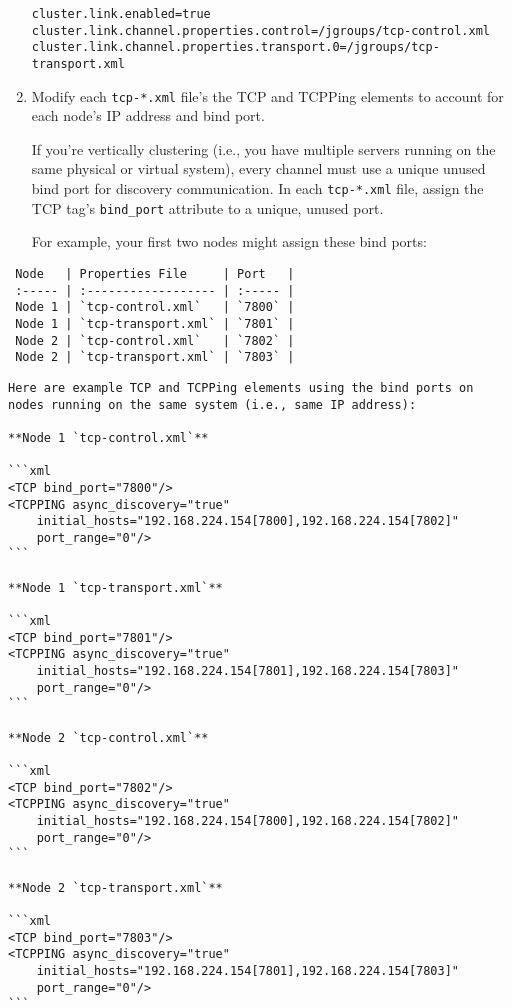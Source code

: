 \begin{enumerate}
\begin{verbatim}
cluster.link.enabled=true
cluster.link.channel.properties.control=/jgroups/tcp-control.xml
cluster.link.channel.properties.transport.0=/jgroups/tcp-transport.xml
\end{verbatim}
\item
  Modify each \texttt{tcp-*.xml} file's the TCP and TCPPing elements to
  account for each node's IP address and bind port.

  If you're vertically clustering (i.e., you have multiple servers
  running on the same physical or virtual system), every channel must
  use a unique unused bind port for discovery communication. In each
  \texttt{tcp-*.xml} file, assign the TCP tag's \texttt{bind\_port}
  attribute to a unique, unused port.

  For example, your first two nodes might assign these bind ports:
\end{enumerate}

\noindent\hrulefill

\begin{verbatim}
 Node   | Properties File     | Port   |
 :----- | :------------------ | :----- |
 Node 1 | `tcp-control.xml`   | `7800` |
 Node 1 | `tcp-transport.xml` | `7801` |
 Node 2 | `tcp-control.xml`   | `7802` |
 Node 2 | `tcp-transport.xml` | `7803` |
\end{verbatim}

\noindent\hrulefill

\begin{verbatim}
Here are example TCP and TCPPing elements using the bind ports on nodes running on the same system (i.e., same IP address):

**Node 1 `tcp-control.xml`**

```xml
<TCP bind_port="7800"/>
<TCPPING async_discovery="true"
    initial_hosts="192.168.224.154[7800],192.168.224.154[7802]"
    port_range="0"/>
```

**Node 1 `tcp-transport.xml`**

```xml
<TCP bind_port="7801"/>
<TCPPING async_discovery="true"
    initial_hosts="192.168.224.154[7801],192.168.224.154[7803]"
    port_range="0"/>
```

**Node 2 `tcp-control.xml`**

```xml
<TCP bind_port="7802"/>
<TCPPING async_discovery="true"
    initial_hosts="192.168.224.154[7800],192.168.224.154[7802]"
    port_range="0"/>
```

**Node 2 `tcp-transport.xml`**

```xml
<TCP bind_port="7803"/>
<TCPPING async_discovery="true"
    initial_hosts="192.168.224.154[7801],192.168.224.154[7803]"
    port_range="0"/>
```
\end{verbatim}

